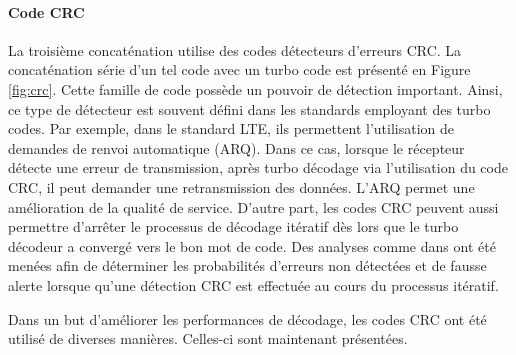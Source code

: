 \paragraph{Code CRC}
La troisième concaténation utilise des codes détecteurs d'erreurs CRC. La concaténation série d'un tel code avec un 
turbo code est présenté en Figure \ref{fig:crc}. Cette famille de code possède un pouvoir de détection important. Ainsi, 
ce type de détecteur est souvent défini dans les standards employant des turbo codes. Par exemple, dans le standard LTE, 
ils permettent l'utilisation de demandes de renvoi automatique (ARQ). Dans ce cas, lorsque le récepteur détecte une 
erreur de transmission, après turbo décodage via l'utilisation du code CRC, il peut demander une retransmission des données. L'ARQ permet une amélioration de la qualité de 
service. D'autre part, les codes CRC peuvent aussi permettre d'arrêter le processus de décodage itératif dès lors que le 
turbo décodeur a convergé vers le bon mot de code. Des analyses comme dans \cite{detectionCRC} ont été menées afin de 
déterminer les probabilités d'erreurs non détectées et de fausse alerte lorsque qu'une détection CRC est effectuée au 
cours du processus itératif. 

Dans un but d'améliorer les performances de décodage, les codes CRC ont été utilisé de diverses manières. Celles-ci sont 
maintenant présentées.

